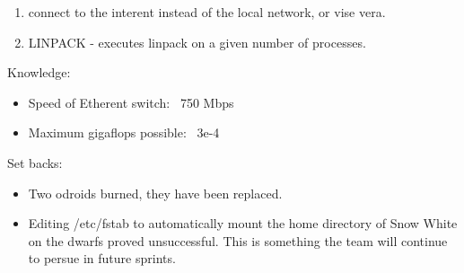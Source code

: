 \begin{description}
\begin{itemize}
\begin{enumerate}
        	\item connect to the interent instead of the local network, or vise vera.
      	\item LINPACK - executes linpack on a given number of processes. 
      \end{enumerate}
\end{itemize}
Knowledge:
\begin{itemize}
	\item Speed of Etherent switch: ~750 Mbps
	\item Maximum gigaflops possible: ~3e-4
\end{itemize}
Set backs:
\begin{itemize}
	\item Two odroids burned, they have been replaced.
	\item Editing /etc/fstab to automatically mount the home directory of Snow White
    on the dwarfs proved unsuccessful. This is something the team will continue
    to persue in future sprints.
\end{itemize}
\end{description}


